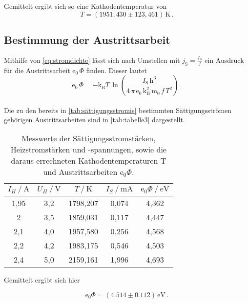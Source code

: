 Gemittelt ergibt sich so eine Kathodentemperatur von
\begin{equation*}
    T = (1951,430 \pm 123,461) \,\unit{\kelvin} \,.
\end{equation*}


\subsection{Bestimmung der Austrittsarbeit}

Mithilfe von \eqref{eq:stromdichte} lässt sich nach Umstellen mit $j_\text{S} = \frac{I_\text{S}}{f}$ ein Ausdruck für die Austrittsarbeit $\text{e}_0 \,\Phi$ finden.
Dieser lautet
\begin{equation*}
    \text{e}_0 \,\Phi = -\text{k}_\text{B} T \,\ln \left(\dfrac{I_\text{S} \, \text{h}^3}{4 \, \pi \, \text{e}_0 \, \text{k}^2_\text{B} \, \text{m}_0 \,f \,  T^2}\right) \,.
\end{equation*} \\

Die zu den bereits in \autoref{tab:sättigungsstromis} bestimmten Sättigungsströmen gehörigen Austrittsarbeiten sind in \autoref{tab:tabelle3} dargestellt.

%
%
%
%

\begin{table}[H]
    \centering
    \caption{Messwerte der Sättigungsstromstärken, Heizstromstärken und -spannungen, sowie die daraus errechneten Kathodentemperaturen T und Austrittsarbeiten $\text{e}_0\Phi$.}
    \label{tab:tabelle3}
    \begin{tabular}{S[table-format=1.2] S S S S}
        \toprule
        {$I_{H} \mathbin{/} \unit{\ampere}$} & {$U_{H} \mathbin{/} \unit{\volt}$} & {$T \mathbin{/} \unit{\kelvin}$} & {$I_{S} \mathbin{/} \unit{\milli\ampere}$} & {$\text{e}_0\Phi \mathbin{/} \unit{\eV}$} \\
        ,95&3,2&1798,207&0,074&4,362\\
        2   &3,5&1859,031&0,117&4,447\\
        2,1 &4,0&1957,580&0.256&4,568\\
        2,2 &4,2&1983,175&0,546&4,503\\
        2,4 &5,0&2159,161&1,996&4,693\\
        \bottomrule
    \end{tabular}
\end{table}



Gemittelt ergibt sich hier

\begin{equation*}
    \text{e}_0 \Phi = (4.514 \pm 0.112) \,\unit{\eV} \,.
\end{equation*}
